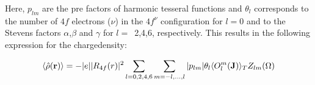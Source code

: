 Here, $p_{lm}$ are the pre factors of harmonic tesseral
functions and $\theta_l$
corresponds to the number of $4f$ electrons ($\nu$) in the
$4f^{\nu}$ configuration for $l=0$ and to
 the Stevens factors $\alpha$,$\beta$ and $\gamma$ for $l=$~2,4,6, respectively.
This results in the following expression for the chargedensity:
		  
  \begin{equation}\label{chargedensity_operator2}
	       \langle \hat\rho(\mathbf r)\rangle=-|e||R_{4f}(r)|^2 \sum_{l=0,2,4,6}\sum_{m=-l,...,l}
	         |p_{lm}| \theta_{l} \langle O_l^m(\mathbf J)\rangle_T Z_{lm}(\Omega)
	      \end{equation} 

  
